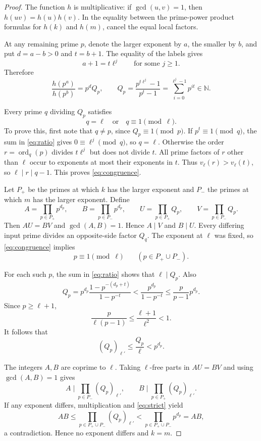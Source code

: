 \documentclass[11pt,a4paper]{article}
\theoremstyle{remark}
\newcommand{\NN}{\mathbb N}
\DeclareMathOperator{\ord}{ord}
\begin{document}
\begin{proof}
The function $h$ is multiplicative: if $\gcd(u,v)=1$, then $h(uv)=h(u)h(v)$. In the equality between the prime-power product formulas for $h(k)$ and $h(m)$, cancel the equal local factors.

At any remaining prime $p$, denote the larger exponent by $a$, the smaller by $b$, and put $d=a-b>0$ and $t=b+1$. The equality of the labels gives
\[
a+1=t\ell^j\qquad\text{for some }j\ge1.
\]
Therefore
\begin{equation}\label{eq:ratio}
\frac{h(p^a)}{h(p^b)}=p^dQ_p,
\qquad Q_p=\frac{p^{t\ell^j}-1}{p^t-1}
=\sum_{i=0}^{\ell^j-1}p^{it}\in\NN.
\end{equation}

Every prime $q$ dividing $Q_p$ satisfies
\begin{equation}\label{eq:congruence}
q=\ell\quad\text{or}\quad q\equiv1\pmod\ell.
\end{equation}
To prove this, first note that $q\ne p$, since $Q_p\equiv1\pmod p$. If $p^t\equiv1\pmod q$, the sum in \eqref{eq:ratio} gives $0\equiv\ell^j\pmod q$, so $q=\ell$. Otherwise the order $r=\ord_q(p)$ divides $t\ell^j$ but does not divide $t$. All prime factors of $r$ other than $\ell$ occur to exponents at most their exponents in $t$. Thus $v_\ell(r)>v_\ell(t)$, so $\ell\mid r\mid q-1$. This proves \eqref{eq:congruence}.

Let $P_+$ be the primes at which $k$ has the larger exponent and $P_-$ the primes at which $m$ has the larger exponent. Define
\[
A=\prod_{p\in P_+}p^{d_p},\qquad
B=\prod_{p\in P_-}p^{d_p},\qquad
U=\prod_{p\in P_+}Q_p,\qquad
V=\prod_{p\in P_-}Q_p.
\]
Then $AU=BV$ and $\gcd(A,B)=1$. Hence $A\mid V$ and $B\mid U$. Every differing input prime divides an opposite-side factor $Q_q$. The exponent at $\ell$ was fixed, so \eqref{eq:congruence} implies
\begin{equation}\label{eq:inputcongruence}
p\equiv1\pmod\ell\qquad(p\in P_+\cup P_-).
\end{equation}

For each such $p$, the sum in \eqref{eq:ratio} shows that $\ell\mid Q_p$. Also
\[
Q_p=p^{d_p}\frac{1-p^{-(d_p+t)}}{1-p^{-t}}
<\frac{p^{d_p}}{1-p^{-t}}
\le\frac p{p-1}p^{d_p}.
\]
Since $p\ge\ell+1$,
\[
\frac{p}{\ell(p-1)}\le\frac{\ell+1}{\ell^2}<1.
\]
It follows that
\begin{equation}\label{eq:strict}
(Q_p)_{\ell'}\le\frac{Q_p}{\ell}<p^{d_p}.
\end{equation}

The integers $A,B$ are coprime to $\ell$. Taking $\ell$-free parts in $AU=BV$ and using $\gcd(A,B)=1$ gives
\[
A\mid\prod_{p\in P_-}(Q_p)_{\ell'},\qquad
B\mid\prod_{p\in P_+}(Q_p)_{\ell'}.
\]
If any exponent differs, multiplication and \eqref{eq:strict} yield
\[
AB\le\prod_{p\in P_+\cup P_-}(Q_p)_{\ell'}
<\prod_{p\in P_+\cup P_-}p^{d_p}=AB,
\]
a contradiction. Hence no exponent differs and $k=m$.
\end{proof}
\end{document}
